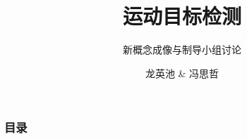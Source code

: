 \documentclass[UTF8]{ctexbeamer}
\title{运动目标检测}
\subtitle{新概念成像与制导小组讨论}
\author{龙英池 \& 冯思哲}
\institute{HIT}
\begin{document}
\frame{\titlepage}

\begin{frame}
    \frametitle{目录}

    \tableofcontents

\end{frame}
\end{document}
